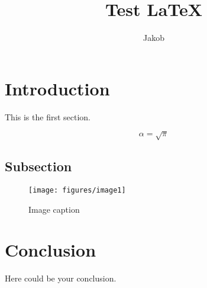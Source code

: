 \documentclass{article}
\begin{document}
\title{Test \LaTeX{}}
\author{Jakob}

\maketitle

\section{Introduction}

This is the first section.

\begin{equation}
    \label{simple_equation}
    \alpha = \sqrt{ \pi }
\end{equation}

\subsection{Subsection}

\begin{figure}
    \centering
    \texttt{[image: figures/image1]}
    \caption{Image caption}
    \label{simulationfigure}
\end{figure}

\section{Conclusion}

Here could be your conclusion.
\end{document}
